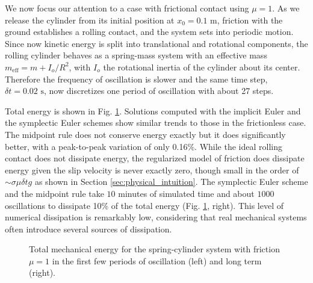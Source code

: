 We now focus our attention to a case with frictional contact using $\mu=1$. As
we release the cylinder from its initial position at $x_0=0.1\text{ m}$,
friction with the ground establishes a rolling contact, and the system sets into
periodic motion. Since now kinetic energy is split into translational and
rotational components, the rolling cylinder behaves as a spring-mass system with
an effective mass $m_\text{eff}=m+I_o/R^2$, with $I_o$ the rotational inertia of
the cylinder about its center. Therefore the frequency of oscillation is slower
and the same time step, $\delta t=0.02\text{ s}$, now discretizes one period of
oscillation with about 27 steps.

Total energy is shown in Fig. \ref{fig:spring_cylinder_energy}. Solutions
computed with the implicit Euler and the symplectic Euler schemes show similar
trends to those in the frictionless case. The midpoint rule does not conserve
energy exactly but it does significantly better, with a peak-to-peak variation
of only 0.16\%. While the ideal rolling contact does not dissipate energy, the
regularized model of friction does dissipate energy given the slip velocity is
never exactly zero, though small in the order of $\sim\sigma\mu\delta t g$ as
shown in Section \ref{sec:physical_intuition}. The symplectic Euler scheme and
the midpoint rule take $10$ minutes of simulated time and about $1000$
oscillations to dissipate 10\% of the total energy (Fig.
\ref{fig:spring_cylinder_energy}, right). This level of numerical dissipation is
remarkably low, considering that real mechanical systems often introduce several
sources of dissipation.
\begin{figure}[!h]
    \centering
    \caption{\label{fig:spring_cylinder_energy} 
    Total mechanical energy for the spring-cylinder system with friction $\mu=1$
    in the first few periods of oscillation (left) and long term (right).}
\end{figure}

